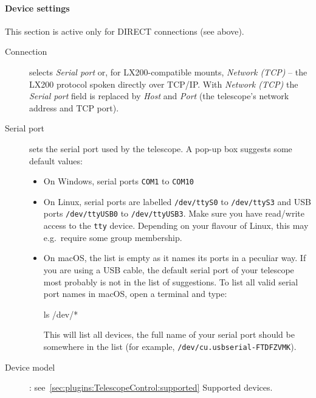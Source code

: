 \paragraph{Device settings}
This section is active only for DIRECT connections (see above).

\begin{description}
\item[Connection] selects \emph{Serial port} or, for
  LX200-compatible mounts, \emph{Network (TCP)} -- the LX200 protocol spoken
  directly over TCP/IP. With \emph{Network (TCP)} the \emph{Serial port} field
  is replaced by \emph{Host} and \emph{Port} (the telescope's network address
  and TCP port).
\item[Serial port] sets the serial port used by the telescope.
  A pop-up box suggests some default values:
  \begin{itemize}
  \item On Windows, serial ports \texttt{COM1} to \texttt{COM10}
  \item On Linux, serial ports are labelled \texttt{/dev/ttyS0} to
    \texttt{/dev/ttyS3} and USB ports \texttt{/dev/ttyUSB0} to
    \texttt{/dev/ttyUSB3}. Make sure you have read/write access to the \texttt{tty} device. 
	Depending on your flavour of Linux, this may e.g.\ require some group membership.
  \item On macOS, the list is empty as it names its ports in a
    peculiar way.
  If you are using a USB cable, the default serial port of your
  telescope most probably is not in the list of suggestions.  To list
  all valid serial port names in macOS, open a terminal and type:

\begin{commands}
  ls /dev/*
\end{commands}
%
This will list all devices, the full name of your serial port should
be somewhere in the list (for example,
\texttt{/dev/cu.usbserial-FTDFZVMK}).
\end{itemize}

\item[Device model]: see~\ref{sec:plugins:TelescopeControl:supported} Supported devices.
\end{description}

